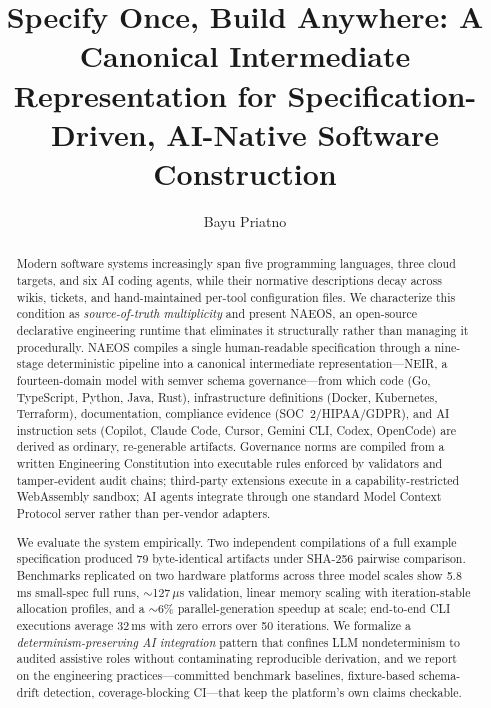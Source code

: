 \documentclass[sigconf,nonacm]{acmart}
\begin{document}
\title[NAEOS: Specify Once, Build Anywhere]{Specify Once, Build Anywhere: A Canonical Intermediate Representation for Specification-Driven, AI-Native Software Construction}

\author{Bayu Priatno}

\begin{abstract}
Modern software systems increasingly span five programming languages, three cloud targets, and six AI coding agents, while their normative descriptions decay across wikis, tickets, and hand-maintained per-tool configuration files. We characterize this condition as \emph{source-of-truth multiplicity} and present NAEOS, an open-source declarative engineering runtime that eliminates it structurally rather than managing it procedurally. NAEOS compiles a single human-readable specification through a nine-stage deterministic pipeline into a canonical intermediate representation---NEIR, a fourteen-domain model with semver schema governance---from which code (Go, TypeScript, Python, Java, Rust), infrastructure definitions (Docker, Kubernetes, Terraform), documentation, compliance evidence (SOC~2/HIPAA/GDPR), and AI instruction sets (Copilot, Claude Code, Cursor, Gemini CLI, Codex, OpenCode) are derived as ordinary, re-generable artifacts. Governance norms are compiled from a written Engineering Constitution into executable rules enforced by validators and tamper-evident audit chains; third-party extensions execute in a capability-restricted WebAssembly sandbox; AI agents integrate through one standard Model Context Protocol server rather than per-vendor adapters.

We evaluate the system empirically. Two independent compilations of a full example specification produced 79 byte-identical artifacts under SHA-256 pairwise comparison. Benchmarks replicated on two hardware platforms across three model scales show 5.8\,ms small-spec full runs, $\sim$127\,$\mu$s validation, linear memory scaling with iteration-stable allocation profiles, and a $\sim$6\% parallel-generation speedup at scale; end-to-end CLI executions average 32\,ms with zero errors over 50 iterations. We formalize a \emph{determinism-preserving AI integration} pattern that confines LLM nondeterminism to audited assistive roles without contaminating reproducible derivation, and we report on the engineering practices---committed benchmark baselines, fixture-based schema-drift detection, coverage-blocking CI---that keep the platform's own claims checkable.
\end{abstract}
\end{document}
